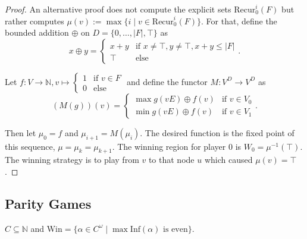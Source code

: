\documentclass{article}
\begin{document}
\begin{proof}
	An alternative proof does not compute the explicit sets $\text{Recur}^i_0(F)$ but rather computes $\mu(v) := \max \{i \mid v \in \text{Recur}^i_0(F)\}$. For that, define the bounded addition $\oplus$ on $D = \{0, \dots, |F|, \top\}$ as 
	$$x \oplus y = \begin{cases} x+y & \text{if } x \neq \top, y \neq \top, x+y \leq |F| \\ \top & \text{else} \end{cases}.$$
	
	Let $f : V \rightarrow \mathbb{N}, v \mapsto \begin{cases} 1 & \text{if } v \in F \\ 0 & \text{else} \end{cases}$ and define the functor $M : V^D \rightarrow V^D$ as
	$$ (M(g))(v) = \begin{cases}
		\max g(vE) \oplus f(v) & \text{if } v \in V_0 \\
		\min g(vE) \oplus f(v) & \text{if } v \in V_1
	\end{cases}. $$
	
	Then let $\mu_0 = f$ and $\mu_{i+1} = M(\mu_i)$. The desired function is the fixed point of this sequence, $\mu = \mu_k = \mu_{k+1}$. The winning region for player 0 is $W_0 = \mu^{-1}(\top)$. The winning strategy is to play from $v$ to that node $u$ which caused $\mu(v) = \top$.
\end{proof}

\vspace{1.5cm}
\subsection{Parity Games}
$C \subseteq \mathbb{N}$ and $\text{Win} = \{ \alpha \in C^\omega \mid \max \text{Inf}(\alpha) \text{ is even}\}$.
\end{document}
